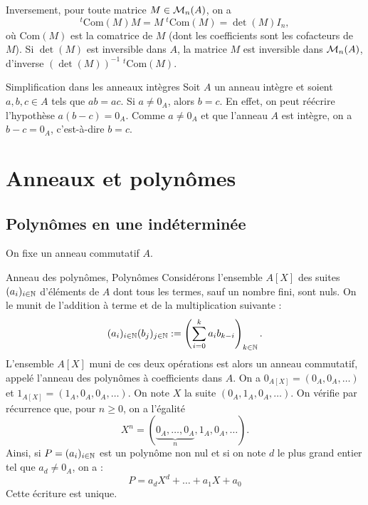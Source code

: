 \documentclass[]{report}
\begin{document}
\begin{ex}{}{}
\begin{enumerate}
        Inversement, pour toute matrice $M \in \mathcal{M}_n(A)$, on a
        \[{}^t\mathrm{Com}(M) M = M \; {}^t\mathrm{Com}(M) = \det(M) I_n,\]
        où $\mathrm{Com}(M)$ est la comatrice de $M$ (dont les coefficients sont les cofacteurs de $M$). Si $\det(M)$ est inversible dans $A$, la matrice $M$ est inversible dans $\mathcal{M}_n(A)$, d'inverse $(\det(M))^{-1} \; {}^t\mathrm{Com}(M)$.
    \end{enumerate}
\end{ex}

\begin{re}{Simplification dans les anneaux intègres}{}
    Soit $A$ un anneau intègre et soient $a, b, c \in A$ tels que $ab = ac$. Si $a \neq 0_A$, alors $b = c$. En effet, on peut réécrire l'hypothèse $a(b - c) = 0_A$. Comme $a \neq 0_A$ et que l'anneau $A$ est intègre, on a $b - c = 0_A$, c'est-à-dire $b = c$.
\end{re}

\section{Anneaux et polynômes}

\subsection{Polynômes en une indéterminée}

On fixe un anneau commutatif $A$.

\begin{df}{Anneau des polynômes, Polynômes}{}
    Considérons l'ensemble $A[X]$ des suites $(a_i)_{i\in \mathbb{N}}$ d'éléments de $A$ dont tous les termes, sauf un nombre fini, sont nuls. On le munit de l'addition à terme et de la multiplication suivante :
    \[(a_i)_{i \in \mathbb{N}} (b_j)_{j \in \mathbb{N}} := \left(\sum_{i = 0}^{k} a_i b_{k - i}\right)_{k \in \mathbb{N}}.\]
    L'ensemble $A[X]$ muni de ces deux opérations est alors un anneau commutatif, appelé l'anneau des polynômes à coefficients dans $A$. On a $0_{A[X]} = (0_A, 0_A, \ldots)$ et $1_{A[X]} = (1_A, 0_A, 0_A, \ldots)$.
    On note $X$ la suite $(0_A, 1_A, 0_A, \ldots)$. On vérifie par récurrence que, pour $n \ge 0$, on a l'égalité
    \[X^n = (\underbrace{0_A, \ldots, 0_A}_{n}, 1_A, 0_A, \ldots).\]
    Ainsi, si $P = (a_i)_{i \in \mathbb{N}}$ est un polynôme non nul et si on note $d$ le plus grand entier tel que $a_d \neq 0_A$, on a :
    \[P = a_d X^d + \dots + a_1 X + a_0\]
    Cette écriture est unique.
\end{df}
\end{document}
